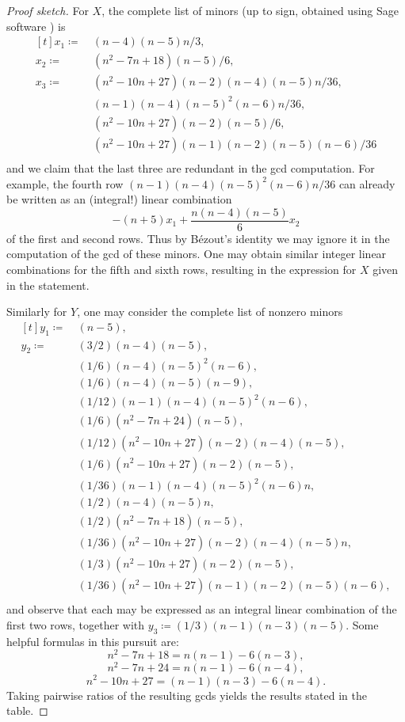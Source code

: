 \documentclass[11pt]{article}
\theoremstyle{definition}
\numberwithin{equation}{section}
\numberwithin{equation}{section}
\begin{document}
\begin{proof}[{\it Proof sketch}]
For $X$, the complete list of minors (up to sign, obtained using Sage software \cite{sagemath}) is
\[ \begin{aligned}[t] 
 x_1 \coloneqq \ & (n - 4)(n - 5)n/3, \\[-.3em]
 x_2 \coloneqq \ & (n^2 - 7n + 18)(n - 5)/6, \\[-.3em]
 x_3 \coloneqq \ & (n^2 - 10n + 27)(n - 2)(n - 4)(n - 5)n/36, \\[-.3em]
 & (n - 1)(n - 4)(n - 5)^2(n - 6)n/36, \\[-.3em]
 & (n^2 - 10n + 27)(n - 2)(n - 5)/6, \\[-.3em]
 & (n^2 - 10n + 27)(n - 1)(n - 2)(n - 5)(n - 6)/36 \\[-.3em]
\end{aligned} \]
and we claim that the last three are redundant in the gcd computation.  For example, the fourth row $(n - 1)(n - 4)(n - 5)^2(n - 6)n/36$ can already be written as an (integral!) linear combination 
\[ -(n+5)x_1 + \frac{n(n-4)(n-5)}{6} x_2 \]
of the first and second rows.  Thus by B\'ezout's identity we may ignore it in the computation of the gcd of these minors.  One may obtain similar integer linear combinations for the fifth and sixth rows, resulting in the expression for $X$ given in the statement.

Similarly for $Y$, one may consider the complete list of nonzero minors
\[ \begin{aligned}[t] 
 y_1 \coloneqq \ & (n - 5), \\[-.3em]
 y_2 \coloneqq \ & (3/2)(n - 4)(n - 5), \\[-.3em]
 & (1/6)(n - 4)(n - 5)^2(n - 6), \\[-.3em]
 & (1/6)(n - 4)(n - 5)(n - 9), \\[-.3em]
 & (1/12)(n - 1)(n - 4)(n - 5)^2(n - 6), \\[-.3em]
 & (1/6)(n^2 - 7n + 24)(n - 5), \\[-.3em]
 & (1/12)(n^2 - 10n + 27)(n - 2)(n - 4)(n - 5), \\[-.3em]
 & (1/6)(n^2 - 10n + 27)(n - 2)(n - 5), \\[-.3em]
 & (1/36)(n - 1)(n - 4)(n - 5)^2(n - 6)n, \\[-.3em]
 & (1/2)(n - 4)(n - 5)n, \\[-.3em]
 & (1/2)(n^2 - 7n + 18)(n - 5), \\[-.3em]
 & (1/36)(n^2 - 10n + 27)(n - 2)(n - 4)(n - 5)n, \\[-.3em]
 & (1/3)(n^2 - 10n + 27)(n - 2)(n - 5), \\[-.3em]
 & (1/36)(n^2 - 10n + 27)(n - 1)(n - 2)(n - 5)(n - 6), \\[-.3em]
\end{aligned} \]
and observe that each may be expressed as an integral linear combination of the first two rows, together with $y_3 \coloneqq  (1/3)(n-1)(n-3)(n-5)$.  Some helpful formulas in this pursuit are:
\[ n^2 - 7n + 18 = n(n-1)-6(n-3), \]
\[ n^2 - 7n + 24 = n(n-1)-6(n-4), \]
\[ n^2 - 10n + 27 = (n-1)(n-3)-6(n-4). \]
Taking pairwise ratios of the resulting gcds yields the results stated in the table.
\end{proof}
\end{document}
